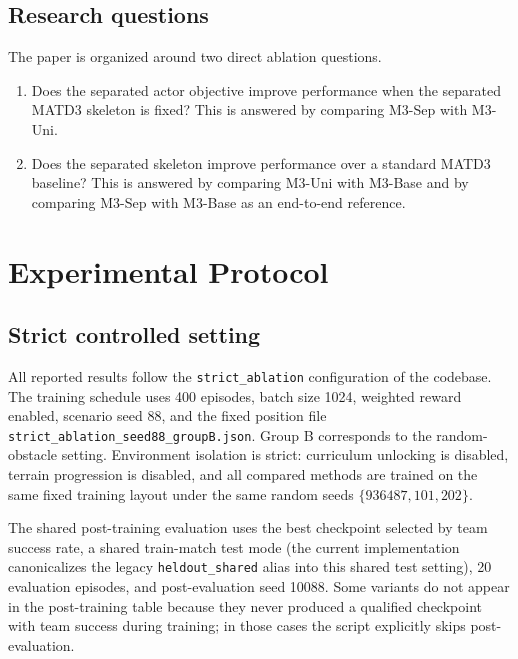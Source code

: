 \documentclass[a4paper,fleqn]{cas-dc}
\begin{document}
\subsection{Research questions}

The paper is organized around two direct ablation questions.

\begin{enumerate}
\item Does the separated actor objective improve performance when the separated MATD3 skeleton is fixed? This is answered by comparing M3-Sep with M3-Uni.
\item Does the separated skeleton improve performance over a standard MATD3 baseline? This is answered by comparing M3-Uni with M3-Base and by comparing M3-Sep with M3-Base as an end-to-end reference.
\end{enumerate}

\section{Experimental Protocol}

\subsection{Strict controlled setting}

All reported results follow the \texttt{strict\_ablation} configuration of the codebase. The training schedule uses 400 episodes, batch size 1024, weighted reward enabled, scenario seed 88, and the fixed position file \texttt{strict\_ablation\_seed88\_groupB.json}. Group B corresponds to the random-obstacle setting. Environment isolation is strict: curriculum unlocking is disabled, terrain progression is disabled, and all compared methods are trained on the same fixed training layout under the same random seeds $\{936487, 101, 202\}$.

The shared post-training evaluation uses the best checkpoint selected by team success rate, a shared train-match test mode (the current implementation canonicalizes the legacy \texttt{heldout\_shared} alias into this shared test setting), 20 evaluation episodes, and post-evaluation seed 10088. Some variants do not appear in the post-training table because they never produced a qualified checkpoint with team success during training; in those cases the script explicitly skips post-evaluation.
\end{document}
